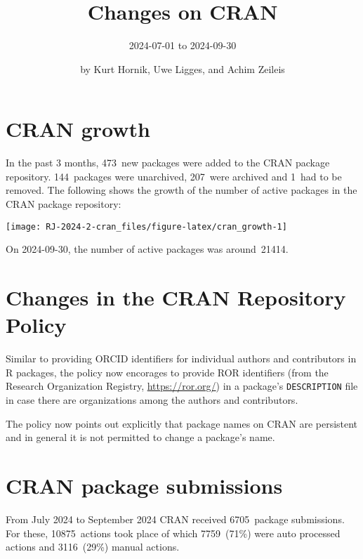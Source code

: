 \title{Changes on CRAN}

\subtitle{%
2024-07-01 to 2024-09-30
}

\author{by Kurt Hornik, Uwe Ligges, and Achim Zeileis}

\maketitle


\section{CRAN growth}\label{cran-growth}

In the past 3 months, 473~new packages were
added to the CRAN package repository. 144~packages
were unarchived, 207~were archived and
1~had to be removed. The following shows the
growth of the number of active packages in the CRAN package repository:

\begin{center}\texttt{[image: RJ-2024-2-cran\_files/figure-latex/cran\_growth-1]} \end{center}

\noindent On 2024-09-30, the number of active packages was around~21414.

\section{Changes in the CRAN Repository Policy}\label{changes-in-the-cran-repository-policy}

Similar to providing ORCID identifiers for individual authors and contributors in R packages,
the policy now encorages to provide ROR identifiers (from the Research Organization Registry,
\url{https://ror.org/}) in a package's \texttt{DESCRIPTION} file in case there are organizations among
the authors and contributors.

The policy now points out explicitly that package names on CRAN are persistent and in general
it is not permitted to change a package's name.

\section{CRAN package submissions}\label{cran-package-submissions}

From July 2024 to September 2024
CRAN received 6705~package submissions.
For these, 10875~actions took place of which
7759~(71\%) were auto processed actions and
3116~(29\%) manual actions.

